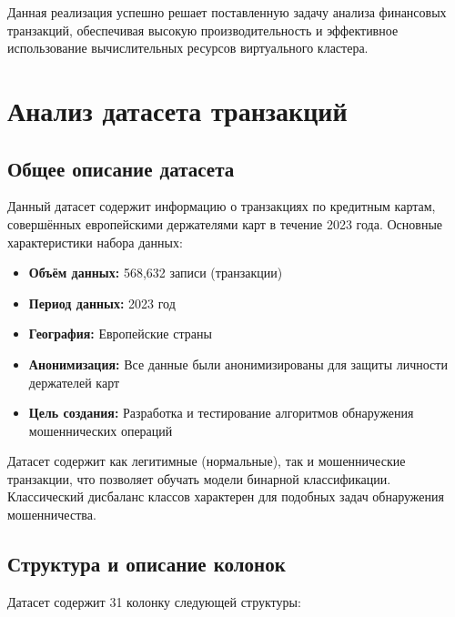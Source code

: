 \documentclass[areaset=advanced]{scrartcl}
\begin{document}
Данная реализация успешно решает поставленную задачу анализа финансовых транзакций, обеспечивая высокую производительность и эффективное использование вычислительных ресурсов виртуального кластера.

\newpage 
\section{Анализ датасета транзакций}

\subsection{Общее описание датасета}

Данный датасет содержит информацию о транзакциях по кредитным картам, совершённых европейскими держателями карт в течение 2023 года. Основные характеристики набора данных:

\begin{itemize}
    \item \textbf{Объём данных:} 568,632 записи (транзакции)
    \item \textbf{Период данных:} 2023 год
    \item \textbf{География:} Европейские страны
    \item \textbf{Анонимизация:} Все данные были анонимизированы для защиты личности держателей карт
    \item \textbf{Цель создания:} Разработка и тестирование алгоритмов обнаружения мошеннических операций
\end{itemize}

Датасет содержит как легитимные (нормальные), так и мошеннические транзакции, что позволяет обучать модели бинарной классификации. Классический дисбаланс классов характерен для подобных задач обнаружения мошенничества.

\subsection{Структура и описание колонок}

Датасет содержит 31 колонку следующей структуры:
\end{document}
